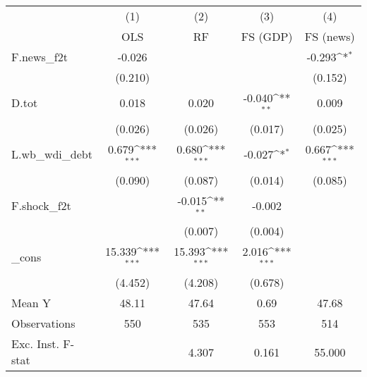 {
\def\sym#1{\ifmmode^{#1}\else\(^{#1}\)\fi}
\begin{tabular}{l*{4}{c}}
\toprule
            &\multicolumn{1}{c}{(1)}&\multicolumn{1}{c}{(2)}&\multicolumn{1}{c}{(3)}&\multicolumn{1}{c}{(4)}\\
            &\multicolumn{1}{c}{OLS}&\multicolumn{1}{c}{RF}&\multicolumn{1}{c}{FS (GDP)}&\multicolumn{1}{c}{FS (news)}\\
\midrule
F.news\_f2t  &      -0.026         &                     &                     &      -0.293\sym{*}  \\
            &     (0.210)         &                     &                     &     (0.152)         \\
\addlinespace
D.tot       &       0.018         &       0.020         &      -0.040\sym{**} &       0.009         \\
            &     (0.026)         &     (0.026)         &     (0.017)         &     (0.025)         \\
\addlinespace
L.wb\_wdi\_debt&       0.679\sym{***}&       0.680\sym{***}&      -0.027\sym{*}  &       0.667\sym{***}\\
            &     (0.090)         &     (0.087)         &     (0.014)         &     (0.085)         \\
\addlinespace
F.shock\_f2t &                     &      -0.015\sym{**} &      -0.002         &                     \\
            &                     &     (0.007)         &     (0.004)         &                     \\
\addlinespace
\_cons      &      15.339\sym{***}&      15.393\sym{***}&       2.016\sym{***}&                     \\
            &     (4.452)         &     (4.208)         &     (0.678)         &                     \\
\midrule
Mean Y      &       48.11         &       47.64         &        0.69         &       47.68         \\
Observations&         550         &         535         &         553         &         514         \\
Exc. Inst. F-stat&                     &       4.307         &       0.161         &      55.000         \\
\bottomrule
\end{tabular}
}
